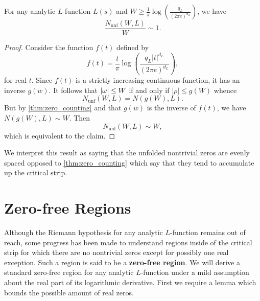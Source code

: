     \begin{proposition}\label{prop:unfolded_zeros_are_evenly_spaced}
    For any analytic \(L\)-function \(L(s)\) and \(W \ge \frac{1}{\pi}\log\left(\frac{q_{L}}{(2\pi e)^{d_{L}}}\right)\), we have
    \[
      \frac{N_{\text{unf}}(W,L)}{W} \sim 1.
    \]
    \end{proposition}
    \begin{proof}
      Consider the function \(f(t)\) defined by
      \[
        f(t) = \frac{t}{\pi}\log\left(\frac{q_{L}|t|^{d_{L}}}{(2\pi e)^{d_{L}}}\right),
      \]
      for real \(t\). Since \(f(t)\) is a strictly increasing continuous function, it has an inverse \(g(w)\). It follows that \(|\omega| \le W\) if and only if \(|\rho| \le g(W)\) whence
      \[
        N_{\text{unf}}(W,L) = N(g(W),L).
      \]
      But by \cref{thm:zero_counting} and that \(g(w)\) is the inverse of \(f(t)\), we have \(N(g(W),L) \sim W\). Then
      \[
        N_{\text{unf}}(W,L) \sim W,
      \]
      which is equivalent to the claim.
    \end{proof}

    We interpret this result as saying that the unfolded nontrivial zeros are evenly spaced opposed to \cref{thm:zero_counting} which say that they tend to accumulate up the critical strip.
  \section{Zero-free Regions}
    Although the Riemann hypothesis for any analytic \(L\)-function remains out of reach, some progress has been made to understand regions inside of the critical strip for which there are no nontrivial zeros except for possibly one real exception. Such a region is said to be a \textbf{zero-free region}. We will derive a standard zero-free region for any analytic \(L\)-function under a mild assumption about the real part of its logarithmic derivative. First we require a lemma which bounds the possible amount of real zeros.

